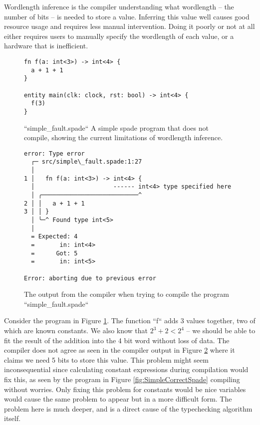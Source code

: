 Wordlength inference is the compiler understanding what wordlength -- the number of bits -- is needed to store a value. Inferring this value well causes good resource usage and requires less manual intervention. Doing it poorly or not at all either requires users to manually specify the wordlength of each value, or a hardware that is inefficient.

\begin{figure}[h]
\begin{center}
\begin{verbatim}
fn f(a: int<3>) -> int<4> {
  a + 1 + 1
}

entity main(clk: clock, rst: bool) -> int<4> {
  f(3)
}
\end{verbatim}
\end{center}
\label{fig:SimpleFaultSpade}
\caption{``simple\_fault.spade`` A simple spade program that does not compile, showing the current limitations of wordlength inference.}
\end{figure}

\begin{figure}[h]
\begin{center}
\begin{verbatim}
error: Type error
  ┌─ src/simple\_fault.spade:1:27
  │
1 │   fn f(a: int<3>) -> int<4> {
  │                      ------ int<4> type specified here
  │ ╭───────────────────────────^
2 │ │   a + 1 + 1
3 │ │ }
  │ ╰─^ Found type int<5>
  │
  = Expected: 4
  =       in: int<4>
  =      Got: 5
  =       in: int<5>

Error: aborting due to previous error
\end{verbatim}
\end{center}
\label{fig:SimpleFaultSpadeCompileOutput}
\caption{The output from the compiler when trying to compile the program ``simple\_fault.spade``}
\end{figure}

Consider the program in Figure \ref{fig:SimpleFaultSpade}. The function ``f`` adds 3 values together, two of which are known constants. We also know that $2^3 + 2 < 2^4$ -- we should be able to fit the result of the addition into the 4 bit word without loss of data. The compiler does not agree as seen in the compiler output in Figure \ref{fig:SimpleFaultSpadeCompileOutput} where it claims we need 5 bits to store this value. This problem might seem inconsequential since calculating constant expressions during compilation would fix this, as seen by the program in Figure \ref{fig:SimpleCorrectSpade} compiling without worries. Only fixing this problem for constants would be nice variables would cause the same problem to appear but in a more difficult form. The problem here is much deeper, and is a direct cause of the typechecking algorithm itself.

